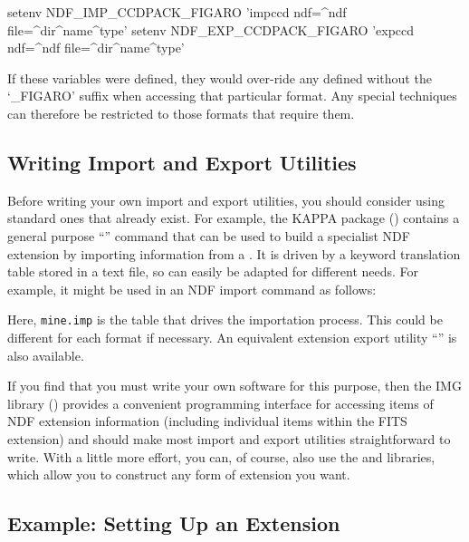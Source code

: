 \documentclass[11pt,twoside,nolof]{starlink}
\providecommand{\file}[1]{{\tt{#1}}}
\begin{document}
\begin{terminalv}
setenv NDF_IMP_CCDPACK_FIGARO 'impccd ndf=^ndf file=^dir^name^type'
setenv NDF_EXP_CCDPACK_FIGARO 'expccd ndf=^ndf file=^dir^name^type'
\end{terminalv}

If these variables were defined, they would over-ride any defined
without the `\_FIGARO' suffix when accessing that particular format.
Any special techniques can therefore be restricted to those formats
that require them.

\subsection{Writing Import and Export Utilities}

Before writing your own import and export utilities, you should
consider using standard ones that already exist. For example, the
KAPPA package () contains a general purpose
``'' command that can be used to build a
specialist NDF extension by importing information from a . It is driven by a keyword translation
table stored in a text file, so can easily be adapted for different
needs.  For example, it might be used in an NDF import command as
follows:


Here, \file{mine.imp} is the table that drives the importation
process. This could be different for each format if necessary. An
equivalent extension export utility ``''
is also available.

If you find that you must write your own software for this purpose,
then the IMG library () provides a convenient
programming interface for accessing items of NDF extension information
(including individual items within the FITS extension) and should make
most import and export utilities straightforward to write. With a
little more effort, you can, of course, also use the
 and  libraries, which allow you
to construct any form of extension you want.

\subsection{Example: Setting Up an Extension}
\end{document}
